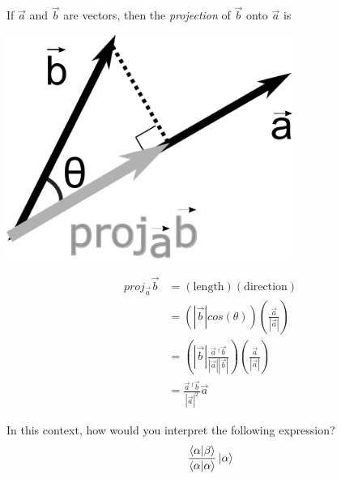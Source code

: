 \begin{questions}
		\question If $\vec a$ and $\vec b$ are vectors, then the \emph{projection} of $\vec{b}$ onto $\vec{a}$ is
			\begin{center}
			\begin{minipage}{0.4\textwidth}
					\includegraphics[width=0.7\textwidth]{includes/states-funcs-vecs-FIGURES/vector_projection.pdf}
			\end{minipage}
			\begin{minipage}{0.4\textwidth}
					\begin{align*}
						proj_{\vec a}\vec{b} &= \left(\text{length}\right)\left(\text{direction}\right) \\
						&= \left(|\vec{b}|cos(\theta)\right)\left( \frac{\vec{a}}{|\vec{a}|}\right) \\
							&= \left(|\vec{b}|\frac{\vec{a}\,^\dag\vec{b}}{|\vec{a}||\vec{b}|}\right)\left( \frac{\vec{a}}{|\vec{a}|}\right) \\
							&= \frac{\vec a\,^\dag \vec{b}}{|\vec{a}|^2}\vec{a} 
					\end{align*}
			\end{minipage}
			\end{center}
		
			\vspace{0.2in}
			In this context, how would you interpret the following expression? 
			\begin{equation*}		
				\frac{\braket{\alpha|\beta}}{\braket{\alpha|\alpha}}\ket{\alpha}
			\end{equation*}

	\end{questions}

